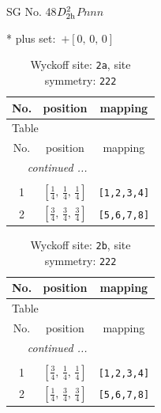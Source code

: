 \documentclass[fleqn,8pt]{jsarticle}
\begin{document}
\setcounter{MaxMatrixCols}{32}

\renewcommand{\tablename}{Table~}
\renewcommand{\figurename}{Figure~}
\begin{center}
\LARGE
SG No. 48\quad$D_{\rm 2h}^{2}$\quad$Pnnn$\quad[ orthorhombic ]
\end{center}
* plus set:\,\,\,$+\left[ 0,\, 0,\, 0 \right]$
\renewcommand{\arraystretch}{1.2}
\begin{longtable}{ccc}
\caption{Wyckoff site: {\tt 2a}, site symmetry: {\tt 222}}
 \\
 \hline \hline
No. & position & mapping \\ \hline \endfirsthead

\multicolumn{2}{l}{\tablename\ \thetable{}} \\
 \hline \hline
No. & position & mapping \\ \hline \endhead

 \hline \hline
\multicolumn{2}{r}{\footnotesize\it continued ...} \\ \endfoot

 \hline \hline
\multicolumn{2}{r}{} \\ \endlastfoot

1 & $\left[ \frac{1}{4},\, \frac{1}{4},\, \frac{1}{4} \right]$ & {\tt [1,2,3,4]} \\ \hline
2 & $\left[ \frac{3}{4},\, \frac{3}{4},\, \frac{3}{4} \right]$ & {\tt [5,6,7,8]} \\
\end{longtable}
\renewcommand{\arraystretch}{1.2}
\begin{longtable}{ccc}
\caption{Wyckoff site: {\tt 2b}, site symmetry: {\tt 222}}
 \\
 \hline \hline
No. & position & mapping \\ \hline \endfirsthead

\multicolumn{2}{l}{\tablename\ \thetable{}} \\
 \hline \hline
No. & position & mapping \\ \hline \endhead

 \hline \hline
\multicolumn{2}{r}{\footnotesize\it continued ...} \\ \endfoot

 \hline \hline
\multicolumn{2}{r}{} \\ \endlastfoot

1 & $\left[ \frac{3}{4},\, \frac{1}{4},\, \frac{1}{4} \right]$ & {\tt [1,2,3,4]} \\ \hline
2 & $\left[ \frac{1}{4},\, \frac{3}{4},\, \frac{3}{4} \right]$ & {\tt [5,6,7,8]} \\
\end{longtable}
\end{document}

